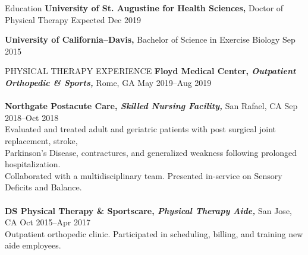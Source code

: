\documentclass{resume} %
\begin{document}
\begin{rSection}{Education}
{\bf University of St. Augustine for Health Sciences,} Doctor of Physical Therapy  \hfill {Expected Dec 2019}

{\bf University of California--Davis,} Bachelor of Science in Exercise Biology  \hfill {Sep 2015}
\end{rSection}
\begin{rSection}{PHYSICAL THERAPY EXPERIENCE}
{\textbf{Floyd Medical Center, \textit{Outpatient Orthopedic \& Sports,}} Rome, GA
\hfill May 2019--Aug 2019}
 \\\\
{\textbf{Northgate Postacute Care, \textit{Skilled Nursing Facility,}} San Rafael, CA
\hfill Sep 2018--Oct 2018 \\
 Evaluated and treated adult and geriatric patients with post surgical joint replacement, stroke, \\Parkinson's Disease, contractures, and generalized weakness following prolonged hospitalization. \\Collaborated with a multidisciplinary team. Presented in-service on Sensory Deficits and Balance.}
 \\\\
 {\textbf{DS Physical Therapy \& Sportscare, \textit{Physical Therapy Aide,}} San Jose, CA
\hfill Oct 2015--Apr 2017 \\
 Outpatient orthopedic clinic. Participated in scheduling, billing, and training new aide employees.}
\end{rSection} 
\end{document}
